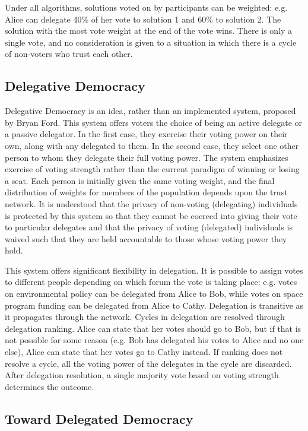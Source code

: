 \documentclass[a4paper]{acm_proc_article-sp}
\begin{document}
Under all algorithms, solutions voted on by participants can be weighted: e.g. Alice can delegate 40\% of her vote to
solution 1 and 60\% to solution 2.  The solution with the most vote weight at the end of the vote wins.  There is
only a single vote, and no consideration is given to a situation in which there is a cycle of non-voters who trust each other.

\subsection{Delegative Democracy}

Delegative Democracy is an idea, rather than an implemented system, proposed by Bryan Ford.  This system offers voters the
choice of being an active delegate or a passive delegator.  In the first case, they exercise their voting power on their own,
along with any delegated to them.  In the second case, they select one other person to whom they delegate their full voting power.
The system emphasizes exercise of voting strength rather than the current paradigm of winning or losing a seat.  Each person is
initially given the same voting weight, and the final distribution of weights for members of the population depends upon the
trust network.  It is understood that the privacy of non-voting (delegating) individuals is protected by this
system so that they cannot be coerced into giving their vote to particular delegates and that the privacy of voting (delegated)
individuals is waived such that they are held accountable to those whose voting power they hold.

This system offers significant flexibility in delegation.  It is possible to assign votes to different people depending on
which forum the vote is taking place: e.g. votes on environmental policy can be delegated from Alice to Bob, while votes on
space program funding can be delegated from Alice to Cathy.  Delegation is transitive as it propagates through the network.
Cycles in delegation are resolved through delegation ranking.  Alice can state that her votes should go to Bob, but if that is
not possible for some reason (e.g. Bob has delegated his votes to Alice and no one else), Alice can state that her votes go to
Cathy instead.  If ranking does not resolve a cycle, all the voting power of the delegates in the cycle are discarded.  After
delegation resolution, a single majority vote based on voting strength determines the outcome.

\subsection{Toward Delegated Democracy}
\end{document}
